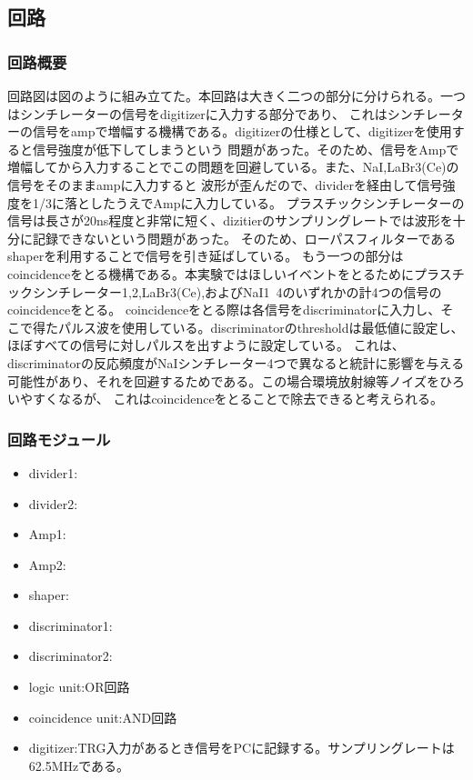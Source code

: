 \documentclass[a4paper,10pt,dvipdfmx,titlepage]{jsarticle}
\numberwithin{equation}{section}
\begin{document}
\subsection{回路}
\subsubsection{回路概要}
回路図は図のように組み立てた。本回路は大きく二つの部分に分けられる。一つはシンチレーターの信号をdigitizerに入力する部分であり、
これはシンチレーターの信号をampで増幅する機構である。digitizerの仕様として、digitizerを使用すると信号強度が低下してしまうという
問題があった。そのため、信号をAmpで増幅してから入力することでこの問題を回避している。また、NaI,LaBr3(Ce)の信号をそのままampに入力すると
波形が歪んだので、dividerを経由して信号強度を1/3に落としたうえでAmpに入力している。
プラスチックシンチレーターの信号は長さが20ns程度と非常に短く、dizitierのサンプリングレートでは波形を十分に記録できないという問題があった。
そのため、ローパスフィルターであるshaperを利用することで信号を引き延ばしている。
もう一つの部分はcoincidenceをとる機構である。本実験ではほしいイベントをとるためにプラスチックシンチレーター1,2,LaBr3(Ce),およびNaI1~4のいずれかの計4つの信号のcoincidenceをとる。
coincidenceをとる際は各信号をdiscriminatorに入力し、そこで得たパルス波を使用している。discriminatorのthresholdは最低値に設定し、ほぼすべての信号に対しパルスを出すように設定している。
これは、discriminatorの反応頻度がNaIシンチレーター4つで異なると統計に影響を与える可能性があり、それを回避するためである。この場合環境放射線等ノイズをひろいやすくなるが、
これはcoincidenceをとることで除去できると考えられる。


\subsubsection{回路モジュール}
\label{subsub:回路モジュール}
\begin{itemize}
    \item divider1:
    \item divider2:
    \item Amp1:
    \item Amp2:
    \item shaper:
    \item discriminator1:
    \item discriminator2:   
    \item logic unit:OR回路
    \item coincidence unit:AND回路
    \item digitizer:TRG入力があるとき信号をPCに記録する。サンプリングレートは62.5MHzである。
\end{itemize}
\end{document}

